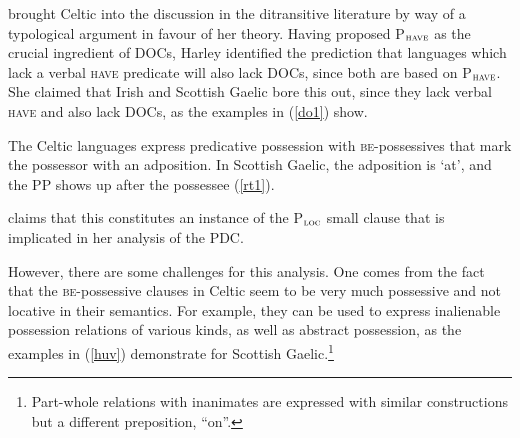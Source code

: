 \documentclass[output=paper,colorlinks,citecolor=brown]{langscibook}
\begin{document}
\citet{gt:Harley:2002a} brought Celtic into the discussion in the ditransitive literature by way of a typological argument in favour of her theory. Having proposed P$_{\textsc{have}}$ as the crucial ingredient of DOCs, Harley identified the prediction that languages which lack a verbal \textsc{have} predicate will also lack DOCs, since both are based on P$_{\textsc{have}}$. She claimed that Irish and Scottish Gaelic bore this out, since they lack verbal \textsc{have} and also lack DOCs, as the examples in (\ref{do1}) show. 


\noindent The Celtic languages express predicative possession with \textsc{be}-possessives that mark the possessor with an adposition. In Scottish Gaelic, the adposition is  `at', and the PP shows up after the possessee (\ref{rt1}). 


\noindent \citet{gt:Harley:2002a} claims that this constitutes an instance of the P$_{\textsc{loc}}$ small clause that is implicated in her analysis of the PDC.

However, there are some challenges for this analysis. One comes from the fact that the \textsc{be}-possessive clauses in Celtic seem to be very much possessive and not locative in their semantics. For example, they can be used to express inalienable possession relations of various kinds, as well as abstract possession, as the examples in (\ref{huv}) demonstrate for Scottish Gaelic.\footnote{Part-whole relations with inanimates are expressed with similar constructions but a different preposition,  ``on''. 


} 
\end{document}

